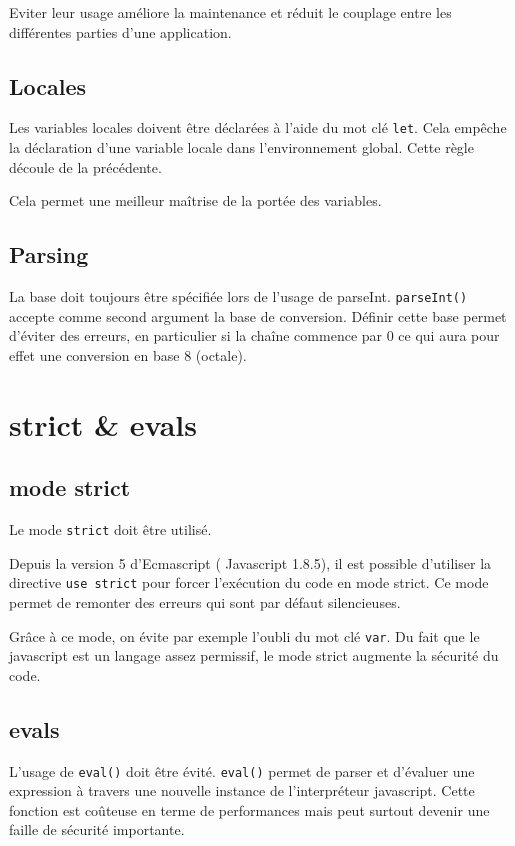 			Eviter leur usage améliore la maintenance et réduit le couplage entre les différentes parties d'une application.

		\subsection{Locales}
			Les variables locales doivent être déclarées à l'aide du mot clé \verb+let+. Cela empêche la déclaration d'une variable locale dans l'environnement global. Cette règle découle de la précédente.

			Cela permet une meilleur maîtrise de la portée des variables.

		\subsection{Parsing}
			La base doit toujours être spécifiée lors de l'usage de parseInt. \verb+parseInt()+ accepte comme second argument la base de conversion. Définir cette base permet d'éviter des erreurs, en particulier si la chaîne commence par 0 ce qui aura pour effet une conversion en base 8 (octale).

	\section{strict \& evals}
		\subsection{mode strict}
			Le mode \verb+strict+ doit être utilisé.

			Depuis la version 5 d'Ecmascript ( Javascript 1.8.5), il est possible d'utiliser la directive \verb+use strict+ pour forcer l'exécution du code en mode strict. Ce mode permet de remonter des erreurs qui sont par défaut silencieuses.

			Grâce à ce mode, on évite par exemple l'oubli du mot clé \verb+var+. Du fait que le javascript est un langage assez permissif, le mode strict augmente la sécurité du code.

		\subsection{evals}
			L'usage de \verb+eval()+ doit être évité. \verb+eval()+ permet de parser et d'évaluer une expression à travers une nouvelle instance de l'interpréteur javascript. Cette fonction est coûteuse en terme de performances mais peut surtout devenir une faille de sécurité importante.

